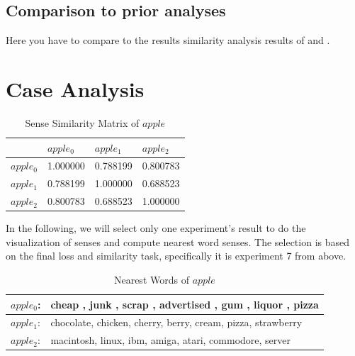 \subsection{Comparison to prior analyses}
Here you have to compare to the results similarity analysis results of \cite{MikolovSutskeverEtAl2013} and \cite{HuangSocherEtAl2012}.

 
\section{Case Analysis}

\begin{table}[tb]
	\caption{Sense Similarity Matrix of $apple$} \label{tab:sensematrixapple} 
	\begin{center} \begin{tabular}{|l|l|l|l|}  
			\hline
			& $apple_0$ & $apple_1$ & $apple_2$ \\ 
			\hline  
			$apple_0$  & 1.000000  & 0.788199 & 0.800783 \\ 
			\hline 
			$apple_1$  & 0.788199 & 1.000000 & 0.688523  \\ 
			\hline 
			$apple_2$  & 0.800783 & 0.688523 & 1.000000  \\
			\hline
		\end{tabular} 
	\end{center}
\end{table}
In the following, we will select only one experiment's result to do the visualization of senses and compute nearest word senses. The selection is based on the final loss and similarity task, specifically it is experiment 7 from above.   

\begin{table}[tb]
	
	\caption{Nearest Words of $apple$} \label{tab:nearestapple} 
	\begin{center} \begin{tabular}{|l|l|}  
			\hline 
			$apple_0$: & cheap , junk , scrap , advertised , gum , liquor , pizza   \\  
			\hline
			$apple_1$: & chocolate, chicken, cherry, berry, cream, pizza, strawberry  \\  
			\hline
			$apple_2$: & macintosh, linux, ibm, amiga, atari, commodore, server   \\  
			\hline
		\end{tabular}
	\end{center}
\end{table}

